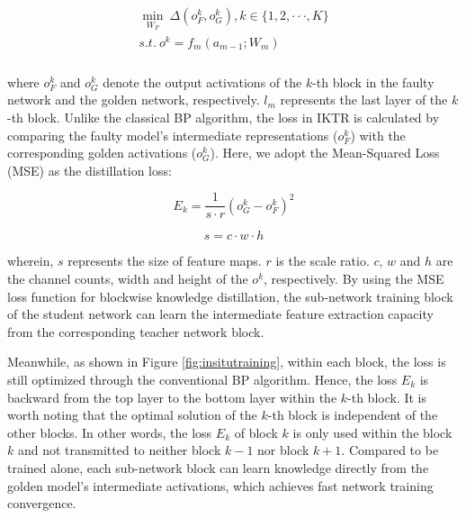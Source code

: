 \begin{equation}
    \begin{aligned}
        \begin{split}
            \mathop {\min }  \limits_{{W_F}} \ \Delta ({o_F^k},o_G^k), k \in \{ 1,2, \cdot  \cdot  \cdot ,K\} \\
            s.t. \ {o^k} = {f_{m}}({a_{m - 1}};W_m)\\
        \end{split}
    \end{aligned}
\end{equation}

where $o_F^k$ and $o_G^k$ denote the output activations of the $k$-th block in the faulty network and the golden network, respectively. $l_m$ represents the last layer of the $k$-th block. Unlike the classical BP algorithm, the loss in IKTR is calculated by comparing the faulty model's intermediate representations ($o_F^k$)  with the corresponding golden activations ($o_G^k$). Here, we adopt the Mean-Squared Loss (MSE) as the distillation loss: 

\begin{equation}
    {E_k} = \frac{1}{{s \cdot r}}{(o_G^k - o_F^k)^2}
    \label{equ::MSE}
\end{equation}

\begin{equation}
    s = c \cdot w \cdot h
\end{equation}

wherein, $s$ represents the size of feature maps.  $r$ is the scale ratio. $c$, $w$ and $h$ are the channel counts, width and height of the $o^k$, respectively. By using the MSE loss function for blockwise knowledge distillation, the sub-network training block of the  student network can learn the intermediate feature extraction capacity from the corresponding teacher network block.                                                                              

Meanwhile, as shown in Figure \ref{fig:insitutraining}, within each block, the loss is still optimized through the conventional BP algorithm. Hence, the loss ${E_k}$ is backward from the top layer to the bottom layer within the $k$-th block. It is worth noting that the optimal solution of the $k$-th block is independent of the other blocks. In other words, the loss ${E_k}$ of block $k$ is only used within the block $k$ and not transmitted to neither block $k-1$ nor block $k+1$. Compared to be trained alone, each sub-network block can learn knowledge directly from the golden model's intermediate activations, which achieves fast network training convergence.

